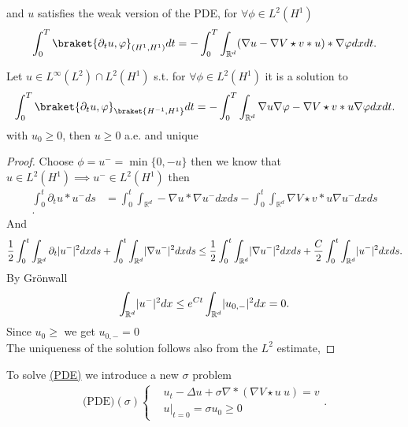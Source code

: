    and $u$ satisfies the weak version of the PDE, for $\forall  \phi \in  L^{2}(H^{1} ) $
   \begin{align*}
     \int_0^{T}    \braket{\partial_t u , \phi }_{(H^{1},H^{1}  )} dt = -\int_0^{T} \int_{\mathbb{R}^{d} }   (\nabla u -\nabla V \star v * u) *\nabla \phi  dx dt
   .\end{align*}
   \begin{lemma}
   Let $u \in L^{\infty}(L^{2} ) \cap L^{2}(H^{1} ) $ s.t. for $\forall  \phi \in  L^{2}(H^{1} ) $ it is a solution to 
   \begin{align*} 
     \int_0^{T}    \braket{\partial_t u , \phi }_{\braket{H^{-1},H^{1}  }} dt = -\int_0^{T} \int_{\mathbb{R}^{d} }   \nabla u \nabla \phi -\nabla V \star v * u \nabla \phi   dx dt
   .\end{align*}
   with $u_{0} \ge  0$, then  $u \ge 0$ a.e. and unique 
   \end{lemma}
   \begin{proof}
     Choose $\phi  = u^{-} = \min \{0,-u\}  $  then we know that $u \in  L^{2}(H^{1} ) \implies u^{-} \in  L^{2}(H^{1} ) $ 
     then 
     \begin{align*}
       \int_0^{t}  \partial_t u * u^{-} ds &= \int_0^{t}  \int_{\mathbb{R}^{d} } - \nabla u * \nabla u^{-} dx ds - \int_{0}^{t}  \int_{\mathbb{R}^{d} } \nabla V \star  v * u \nabla u^{-} dx ds \\
     .\end{align*}
     And 
     \begin{align*}
       \frac{1}{2}\int_0^{t} \int_{\mathbb{R}^{d} } \partial_t \lvert u^{-}\rvert^2 dx ds+ \int_0^{t}  \int_{\mathbb{R}^{d} } \lvert\nabla u^{-}\rvert^2 dx ds \le \frac{1}{2}\int_0^{t}  \int_{\mathbb{R}^{d} } \lvert\nabla u^{-}\rvert^2 dx ds + \frac{C}{2} \int_0^{t} \int_{\mathbb{R}^{d} }\lvert u^{-}\rvert^2 dx ds
     .\end{align*}
     By Grönwall 
     \begin{align*}
       \int_{\mathbb{R}^{d} } \lvert u^-\rvert^2 dx \le  e^{Ct} \int_{\mathbb{R}^{d} } \lvert u_{0,-}\rvert^2 dx = 0
     .\end{align*}
     Since $u_0 \ge $ we get $u_{0,-} = 0$\\[1ex]
     The uniqueness of the solution follows also from the $L^2$ estimate,
   \end{proof}
   \begin{definition}\label{sigma_pde}
   To solve \hyperref[pde_mve_apprach]{(PDE)} we introduce a new $\sigma $ problem
  \begin{align*}
  \text{(PDE)}(\sigma)\begin{cases}
    &u_t - \Delta u + \sigma \nabla*(\nabla V \star  u \ u) = v\\
    &u \rvert_{t=0} = \sigma u_{0}  \ge 0
  \end{cases}
 .\end{align*}
   \end{definition}
